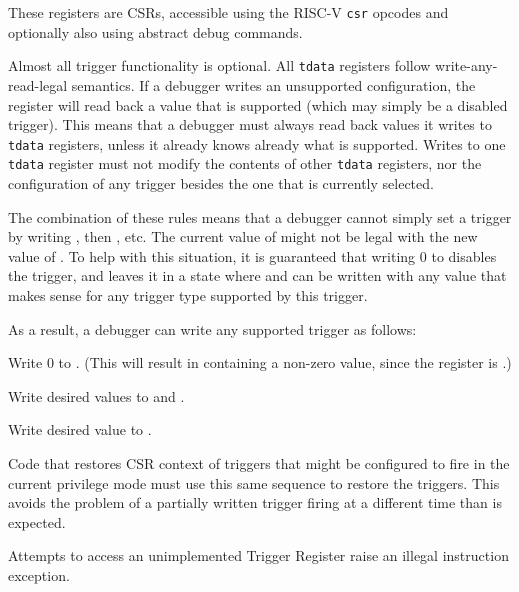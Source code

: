 These registers are CSRs, accessible using the RISC-V {\tt csr} opcodes and
optionally also using abstract debug commands.

Almost all trigger functionality is optional. All {\tt tdata} registers follow
write-any-read-legal semantics. If a debugger writes an unsupported
configuration, the register will read back a value that is supported (which may
simply be a disabled trigger).  This means that a debugger must always read
back values it writes to {\tt tdata} registers, unless it already knows already
what is
supported.  Writes to one {\tt tdata} register must not modify the contents of
other {\tt tdata} registers, nor the configuration of any trigger besides the
one that is currently selected.

The combination of these rules means that a debugger cannot simply set a
trigger by writing \RcsrTdataOne, then \RcsrTdataTwo, etc. The current value
of \RcsrTdataTwo might not be legal with the new value of \RcsrTdataOne. To
help with this situation, it is guaranteed that writing 0 to \RcsrTdataOne
disables the trigger, and leaves it in a state where \RcsrTdataTwo and
\RcsrTdataThree can be written with any value that makes sense for any
trigger type supported by this trigger.

\begin{steps}{As a result, a debugger can write any supported trigger as
follows:}
\item Write 0 to \RcsrTdataOne. (This will result in \RcsrTdataOne containing a
    non-zero value, since the register is \warl.)
\item Write desired values to \RcsrTdataTwo and \RcsrTdataThree.
\item Write desired value to \RcsrTdataOne.
\end{steps}

Code that restores CSR context of triggers that might be configured to fire in
the current privilege mode must use this same sequence to restore the triggers.
This avoids the problem of a partially written trigger firing at a different
time than is expected.

Attempts to access an unimplemented Trigger Register raise an illegal instruction
exception.


